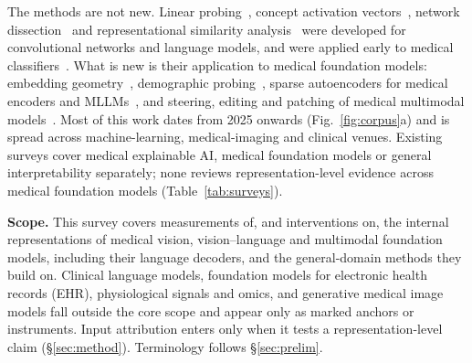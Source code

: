 The methods are not new. Linear probing~\cite{alain2016understanding}, concept activation
vectors~\cite{kim2018interpretability}, network dissection~\cite{bau2017network} and representational
similarity analysis~\cite{kriegeskorte2008representational} were developed for convolutional networks and
language models, and were applied early to medical classifiers~\cite{lucieri2020interpretability}. What is
new is their application to medical foundation models: embedding geometry~\cite{restrepo2026cone},
demographic probing~\cite{zheng2024demographic}, sparse autoencoders for medical encoders and
MLLMs~\cite{bouzid2025insights,nakka2025mammosae,wesp2026sparse}, and steering, editing and patching of
medical multimodal models~\cite{nooralahzadeh2026universal,zhu2026evaluating,sadanandan2026mechanistically}.
Most of this work dates from 2025 onwards (Fig.~\ref{fig:corpus}a) and is spread across machine-learning,
medical-imaging and clinical venues. Existing surveys cover medical explainable AI, medical foundation
models or general interpretability separately; none reviews representation-level evidence across medical
foundation models (Table~\ref{tab:surveys}).

\textbf{Scope.} This survey covers measurements of, and interventions on, the internal representations of
medical vision, vision--language and multimodal foundation models, including their language decoders, and
the general-domain methods they build on. Clinical language models, foundation models for electronic health
records (EHR), physiological signals and omics, and generative medical image models fall outside the core
scope and appear only as marked anchors or instruments. Input attribution enters only when it tests a
representation-level claim (\S\ref{sec:method}). Terminology follows \S\ref{sec:prelim}.

